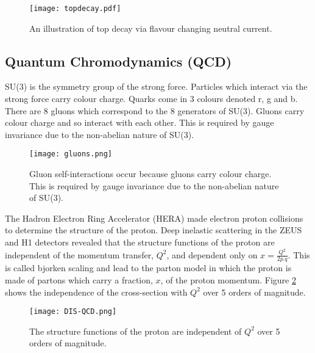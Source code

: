 \begin{figure}
\begin{center}
\texttt{[image: topdecay.pdf]}
\end{center}
\caption{An illustration of top decay via flavour changing neutral current.}
\label{fig:topdecay}
\end{figure}

\subsection{Quantum Chromodynamics (QCD)}

SU(3) is the symmetry group of the strong force. Particles which interact via
the strong force carry colour charge. Quarks come in 3 colours denoted r, g and 
b. There are 8 gluons which correspond to the 8 generators of SU(3). Gluons 
carry colour charge and so interact with each other. This is required by gauge 
invariance due to the non-abelian nature of SU(3). \\

\begin{figure}
\begin{center}
\texttt{[image: gluons.png]}
\end{center}
\caption{Gluon self-interactions occur because gluons carry colour charge. This
is required by gauge invariance due to the non-abelian nature of SU(3).}
\end{figure}

The Hadron Electron Ring Accelerator (HERA) made electron proton collisions to
determine the structure of the proton. Deep inelastic scattering in the ZEUS and
H1 detectors revealed that the structure functions of the proton are independent
of the momentum transfer, $Q^{2}$, and dependent only on $x = 
\frac{Q^{2}}{2p.q}$. This is called bjorken scaling and lead to the parton model 
in which the proton is made of partons which carry a fraction, $x$, of the 
proton momentum. Figure \ref{fig:dis} shows the independence of the 
cross-section with $Q^{2}$ over 5 orders of magnitude. \\

\begin{figure}
\begin{center}
\texttt{[image: DIS-QCD.png]}
\end{center}
\caption{The structure functions of the proton are independent of $Q^{2}$ over 5
orders of magnitude.}
\label{fig:dis}
\end{figure}

